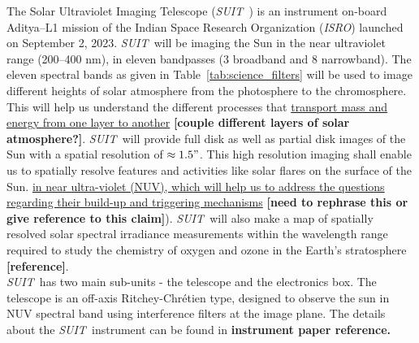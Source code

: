 \documentclass[12pt]{spieman}  %
\newcommand{\isro}{{\it ISRO}}
\newcommand{\suit}{{\it SUIT~}}
\newcommand{\spa}[1]{{\bf\color{green} [#1]}}
\begin{document}
The Solar Ultraviolet Imaging Telescope (\suit) \cite{ghosh16,article} is an instrument on-board Aditya{--}L1 mission \cite{adityal1,aditya} of the Indian Space Research Organization (\isro) launched on September 2, 2023. \suit  will be imaging the Sun in the near ultraviolet range (200{--}400 nm), in eleven bandpasses (3 broadband and 8 narrowband). The eleven spectral bands as given in Table~\ref{tab:science_filters} will be used to image different heights of solar atmosphere from the photosphere to the chromosphere. This will help us understand the different processes that \underline{transport mass and energy from one layer to another} {\spa{couple different layers of solar atmosphere?}}. \suit will provide full disk as well as partial disk images of the Sun with a spatial resolution of $\approx1.5"$. This high resolution imaging shall enable us to spatially resolve features and activities like solar flares on the surface of the Sun. 
\underline{in near ultra-violet (NUV), 
which will help us to address the questions regarding their build-up and triggering mechanisms} \spa{need to rephrase this or give reference to this claim}). \suit will also make a map of spatially resolved solar spectral irradiance measurements within the wavelength range required to study the chemistry of oxygen and ozone in the Earth's stratosphere \spa{reference}.\\

\suit has two main sub-units - the telescope and the electronics box. The telescope is an off-axis Ritchey-Chr\'{e}tien type, designed to observe the sun in NUV spectral band using interference filters at the image plane. The details about the \suit instrument can be found in \textbf{instrument paper  reference.}

\end{document}
